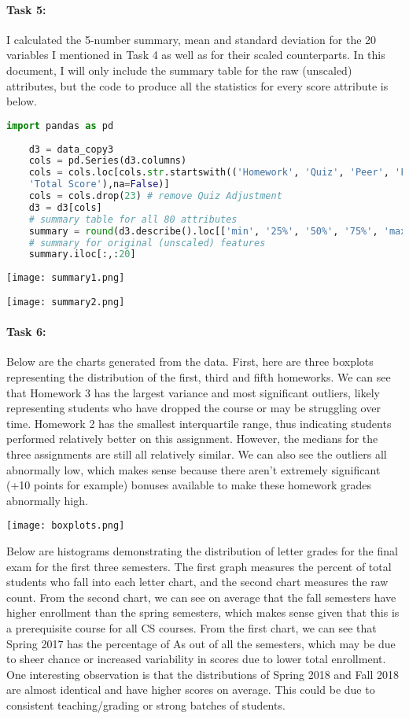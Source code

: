 \documentclass{article}
\begin{document}
\paragraph{\textbf{Task 5:}} I calculated the 5-number summary, mean and standard deviation for the 20 variables I mentioned in Task 4 as well as for their scaled counterparts. In this document, I will only include the summary table for the raw (unscaled) attributes, but the code to produce all the statistics for every score attribute is below. 
    \begin{lstlisting}[language=Python]
    import pandas as pd 
    
    d3 = data_copy3
    cols = pd.Series(d3.columns)
    cols = cols.loc[cols.str.startswith(('Homework', 'Quiz', 'Peer', 'Final Exam', 
    'Total Score'),na=False)]
    cols = cols.drop(23) # remove Quiz Adjustment
    d3 = d3[cols]
    # summary table for all 80 attributes
    summary = round(d3.describe().loc[['min', '25%', '50%', '75%', 'max', 'mean', 'std']],2) 
    # summary for original (unscaled) features
    summary.iloc[:,:20] 
     \end{lstlisting}

    \texttt{[image: summary1.png]}
    
    \texttt{[image: summary2.png]}

\paragraph{\textbf{Task 6:}} Below are the charts generated from the data. First, here are three boxplots representing the distribution of the first, third and fifth homeworks. We can see that Homework 3 has the largest variance and most significant outliers, likely representing students who have dropped the course or may be struggling over time. Homework 2 has the smallest interquartile range, thus indicating students performed relatively better on this assignment. However, the medians for the three assignments are still all relatively similar. We can also see the outliers all abnormally low, which makes sense because there aren't extremely significant (+10 points for example) bonuses available to make these homework grades abnormally high.


\texttt{[image: boxplots.png]}

Below are histograms demonstrating the distribution of letter grades for the final exam for the first three semesters. The first graph measures the percent of total students who fall into each letter chart, and the second chart measures the raw count. From the second chart, we can see on average that the fall semesters have higher enrollment than the spring semesters, which makes sense given that this is a prerequisite course for all CS courses. From the first chart, we can see that Spring 2017 has the percentage of As out of all the semesters, which may be due to sheer chance or increased variability in scores due to lower total enrollment. One interesting observation is that the distributions of Spring 2018 and Fall 2018 are almost identical and have higher scores on average. This could be due to consistent teaching/grading or strong batches of students. 
\end{document}
